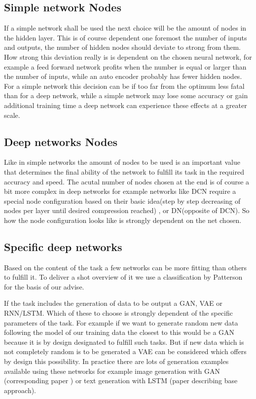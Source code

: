 \documentclass[conference]{IEEEtran}
\begin{document}

\subsection{Simple network Nodes}
If a simple network shall be used the next choice will be the amount of nodes in the hidden layer. This is of course dependent one foremost the number of inputs and outputs, the number of hidden nodes should deviate to strong from them. How strong this deviation really is is dependent on the chosen neural network, for example a feed forward network profits when the number is equal or larger than the number of inputs, while an auto encoder probably has fewer hidden nodes. For a simple network this decision can be if too far from the optimum less fatal than for a deep network, while a simple network may lose some accuracy or gain additional training time a deep network can experience these effects at a greater scale.


\subsection{Deep networks Nodes}
Like in simple networks the amount of nodes to be used is an important value that determines the final ability of the network to fulfill its task in the required accuracy and speed. The acutal number of nodes chosen at the end is of course a bit more complex in deep networks for example networks like DCN require a special node configuration based on their basic idea(step by step decreasing of nodes per layer until desired compression reached) , or DN(opposite of DCN). So how the node configuration looks like is strongly dependent on the net chosen. 



\subsection{Specific deep networks}
Based on the content of the task a few networks can be more fitting than others to fulfill it. To deliver a shot overview of it we use a classification by Patterson\cite{PattersonGibson17} for the basis of our advise.

If the task includes the generation of data to be output a GAN, VAE or RNN/LSTM. Which of these to choose is strongly dependent of the specific parameters of the task. For example if we want to generate random new data following the model of our training data the closest to this would be a GAN because it is by design designated to fulfill such tasks. But if new data which is not completely random is to be generated a VAE can be considered which offers by design this possibility. In practice there are lots of generation examples available using these networks for example image generation with GAN\cite{junyanz2017} (corresponding paper \cite{zhu2016generative}) or text generation with LSTM\cite{gittesttensorflow} (paper describing base approach\cite{sutskever2011generating}).
\end{document}
